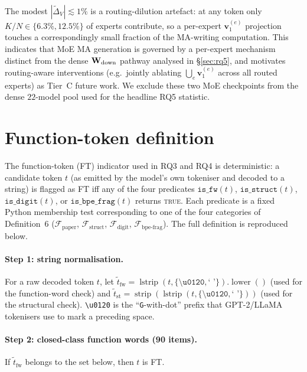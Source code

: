 The modest $|\widetilde{\Delta}_V|\!\lesssim\!1\%$ is a routing-dilution
artefact: at any token only $K/N\!\in\!\{6.3\%,12.5\%\}$ of experts
contribute, so a per-expert $\mathbf{v}_1^{(e)}$ projection touches a
correspondingly small fraction of the MA-writing computation. This
indicates that MoE MA generation is governed by a per-expert mechanism
distinct from the dense $\mathbf{W}_{\text{down}}$ pathway analysed in
\S\ref{sec:rq5}, and motivates routing-aware interventions
(e.g.\ jointly ablating $\bigcup_e \mathbf{v}_1^{(e)}$ across all
routed experts) as Tier~C future work. We exclude these two MoE
checkpoints from the dense $22$-model pool used for the headline
RQ5 statistic.

\section{Function-token definition}
\label{app:ft-definition}

The function-token (FT) indicator used in RQ3 and RQ4 is deterministic:
a candidate token $t$ (as emitted by the model's own tokeniser and
decoded to a string) is flagged as FT iff any of the four predicates
$\texttt{is\_fw}(t)$, $\texttt{is\_struct}(t)$, $\texttt{is\_digit}(t)$, or
$\texttt{is\_bpe\_frag}(t)$ returns \textsc{true}. Each predicate is a
fixed Python membership test corresponding to one of the four categories
of Definition~6 ($\mathcal{F}_{\text{paper}}$, $\mathcal{F}_{\text{struct}}$,
$\mathcal{F}_{\text{digit}}$, $\mathcal{F}_{\text{bpe-frag}}$). The full
definition is reproduced below.

\paragraph{Step 1: string normalisation.}
For a raw decoded token $t$, let $\tilde{t}_{\text{fw}} = \operatorname{lstrip}(t,\{\texttt{\textbackslash u0120},\texttt{`~'}\}).\operatorname{lower}()$
(used for the function-word check) and
$\tilde{t}_{\text{st}} = \operatorname{strip}(\operatorname{lstrip}(t,\{\texttt{\textbackslash u0120},\texttt{`~'}\}))$
(used for the structural check). \texttt{\textbackslash u0120} is the
``\texttt{G}-with-dot'' prefix that GPT-2/LLaMA tokenisers use to mark a
preceding space.

\paragraph{Step 2: closed-class function words (90 items).}
If $\tilde{t}_{\text{fw}}$ belongs to the set below, then $t$ is FT.

